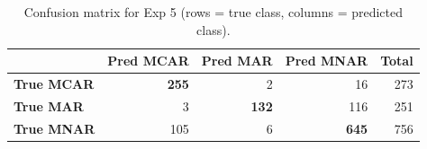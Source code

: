 \begin{table}[htbp]
\centering
\caption{Confusion matrix for Exp 5 (rows = true class, columns = predicted class).}
\label{tab:cm-exp-5}
\begin{tabular}{l|rrr|r}
\toprule
 & \textbf{Pred MCAR} & \textbf{Pred MAR} & \textbf{Pred MNAR} & \textbf{Total} \\
\midrule
\textbf{True MCAR} & \textbf{255} & 2 & 16 & 273 \\
\textbf{True MAR} & 3 & \textbf{132} & 116 & 251 \\
\textbf{True MNAR} & 105 & 6 & \textbf{645} & 756 \\
\bottomrule
\end{tabular}
\end{table}